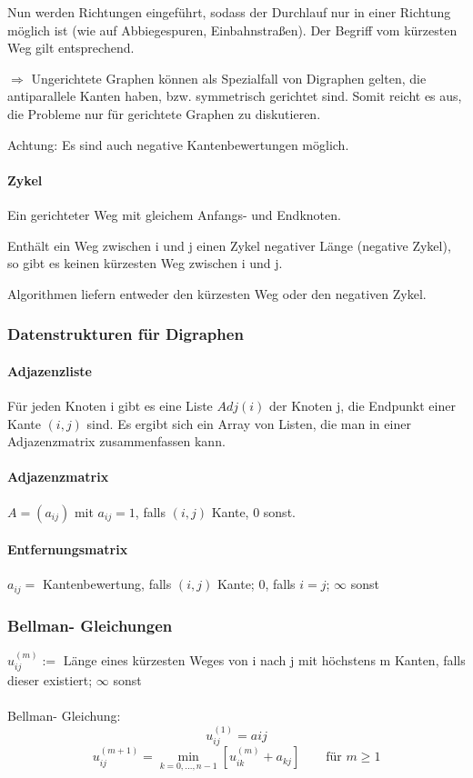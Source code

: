 \documentclass[fleqn]{scrartcl}
\begin{document}
Nun werden Richtungen eingeführt, sodass der Durchlauf nur in einer Richtung möglich ist (wie auf Abbiegespuren, Einbahnstraßen). Der Begriff vom kürzesten Weg gilt entsprechend.

$\Rightarrow$ Ungerichtete Graphen können als Spezialfall von Digraphen gelten, die antiparallele Kanten haben, bzw. symmetrisch gerichtet sind. Somit reicht es aus, die Probleme nur für gerichtete Graphen zu diskutieren.

Achtung: Es sind auch negative Kantenbewertungen möglich.

\paragraph{Zykel}
Ein gerichteter Weg mit gleichem Anfangs- und Endknoten.

Enthält ein Weg zwischen i und j einen Zykel negativer Länge (negative Zykel), so gibt es keinen kürzesten Weg zwischen i und j.

Algorithmen liefern entweder den kürzesten Weg oder den negativen Zykel.
 
\subsubsection{Datenstrukturen für Digraphen}
\paragraph{Adjazenzliste}
Für jeden Knoten i gibt es eine Liste $Adj(i)$ der Knoten j, die Endpunkt einer Kante $(i, j)$ sind. Es ergibt sich ein Array von Listen, die man in einer Adjazenzmatrix zusammenfassen kann.

\paragraph{Adjazenzmatrix}
$A = (a_{ij})$ mit $a_{ij} = 1$, falls  $(i, j)$ Kante, 0 sonst.
\paragraph{Entfernungsmatrix}
$a_{ij} = $ Kantenbewertung, falls $(i, j)$ Kante; 0, falls $i = j$; $\infty$ sonst

\subsubsection{Bellman- Gleichungen}
$u_{ij}^{(m)} := $ Länge eines kürzesten Weges von i nach j mit höchstens m Kanten, falls dieser existiert; $\infty$ sonst\\\\
Bellman- Gleichung:
\[u_{ij} ^{(1)} = a{ij}\]
\[u_{ij}^{(m+1)} = \min_{k = 0, ..., n-1} [u_{ik}^{(m)} + a_{kj}] \quad \quad \text{für } m \geq 1\]
\end{document}
